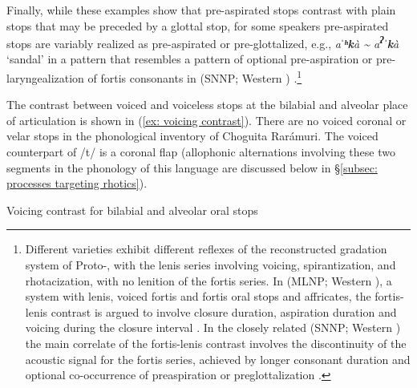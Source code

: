 \largerpage[2]
Finally, while these examples show that pre-aspirated stops contrast with plain stops that may be preceded by a glottal stop, for some speakers pre-aspirated stops are variably realized as pre-aspirated or pre-glottalized, e.g., \textit{aˈ}\textbf{\textit{ʰ}}\textbf{\textit{k}}\textit{à {\textasciitilde} a}\textbf{\textit{\textsuperscript{ʔ}}}\textbf{\textit{ˈk}}\textit{à} ‘sandal’ in a pattern that resembles a pattern of optional pre-aspiration or pre-laryngealization of fortis consonants in  (SNNP; Western ) \parencite{kataoka2010phonetic}.\footnote{Different  varieties exhibit different reflexes of the reconstructed gradation system of Proto-, with the lenis series involving voicing, spirantization, and rhotacization, with no lenition of the fortis series. In  (MLNP; Western ), a system with lenis, voiced fortis and fortis oral stops and affricates, the fortis-lenis contrast is argued to involve closure duration, aspiration duration and voicing during the closure interval \citep[][234]{babel2013descent}. In the closely related  (SNNP; Western ) the main correlate of the fortis-lenis contrast involves the discontinuity of the acoustic signal for the fortis series, achieved by longer consonant duration and optional co-occurrence of preaspiration or preglottalization  \parencite{kataoka2010phonetic}.}

The contrast between voiced and voiceless stops at the bilabial and alveolar place of articulation is shown in (\ref{ex: voicing contrast}). There are no voiced coronal or velar stops in the phonological inventory of Choguita Rarámuri. The voiced counterpart of /t/ is a coronal flap (allophonic alternations involving these two segments in the phonology of this language are discussed below in §\ref{subsec: processes targeting rhotics}).

\ea\label{ex: voicing contrast}
{Voicing contrast for bilabial and alveolar oral stops}

